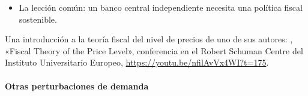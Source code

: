 \documentclass[11pt]{article}
\begin{document}
\begin{itemize}
\begin{enumerate}
\begin{itemize}
      \begin{equation}\label{eq:valoracion}
      \frac{(1+i_{t-1})\,D_{t-1}}{P_t\,Y_t}=\sum_{k=0}^{\infty}\left(\frac{1+\gamma_Y}{1+r}\right)^{k}\left(\tau_{t+k}-g_{t+k}+s_{t+k}\right),
      \end{equation}
      con $D_{t-1}$ la deuda nominal heredada, $s$ el señoreaje sobre el PIB, $r$ el tipo real y $\gamma_Y$ el crecimiento ;
    \item una expansión fiscal que nadie espera pagar con impuestos sube los precios aunque el dinero no crezca; \textcite{Cochrane2023Fiscal} lee así la inflación de Estados Unidos de 2021-2022;\footnote{Hay otra rama, minoritaria, en la que las variables fiscales afectan al nivel de precios a través de la demanda de dinero.}
    \item la crítica principal es que trata como condición de equilibrio lo que es una restricción presupuestaria del Gobierno\nocite{Buiter2002Fiscal}.
    \end{itemize}
  \end{enumerate}
\item La lección común: un banco central independiente necesita una política fiscal sostenible.
\end{itemize}

\begin{anotaciones}
Una introducción a la teoría fiscal del nivel de precios de uno de sus autores: , «Fiscal Theory of the Price Level», conferencia en el Robert Schuman Centre del Instituto Universitario Europeo, \url{https://youtu.be/nfilAvVx4WI?t=175}.
\end{anotaciones}

\paragraph{Otras perturbaciones de demanda}\label{sec:nek-origenes}
\end{document}

